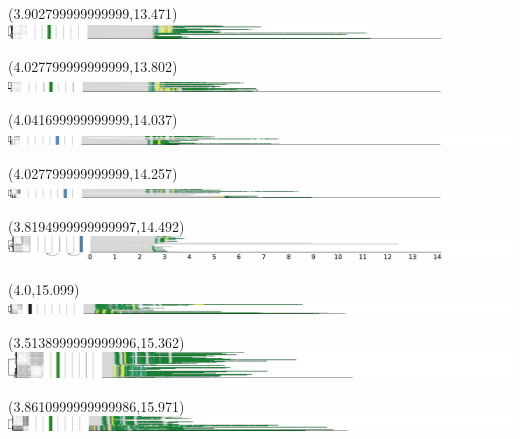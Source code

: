 \documentclass{article}
\begin{document}
\begin{textblock}{13}(3.902799999999999,13.471)\includegraphics{latex/figures/haplotypes-constrained/chr8-HG003.pdf}\end{textblock}
\begin{textblock}{13}(4.027799999999999,13.802)\includegraphics{latex/figures/haplotypes-constrained/chr8-HG004.pdf}\end{textblock}
\begin{textblock}{13}(4.041699999999999,14.037)\includegraphics{latex/figures/haplotypes-constrained/chr8-HG005.pdf}\end{textblock}
\begin{textblock}{13}(4.027799999999999,14.257)\includegraphics{latex/figures/haplotypes-constrained/chr8-HG006.pdf}\end{textblock}
\begin{textblock}{13}(3.8194999999999997,14.492)\includegraphics{latex/figures/haplotypes-constrained/chr8-HG007.pdf}\end{textblock}
\begin{textblock}{13}(4.0,15.099)\includegraphics{latex/figures/haplotypes-constrained/chr11-HG001.pdf}\end{textblock}
\begin{textblock}{13}(3.5138999999999996,15.362)\includegraphics{latex/figures/haplotypes-constrained/chr11-HG002.pdf}\end{textblock}
\begin{textblock}{13}(3.8610999999999986,15.971)\includegraphics{latex/figures/haplotypes-constrained/chr11-HG003.pdf}\end{textblock}
\end{document}
